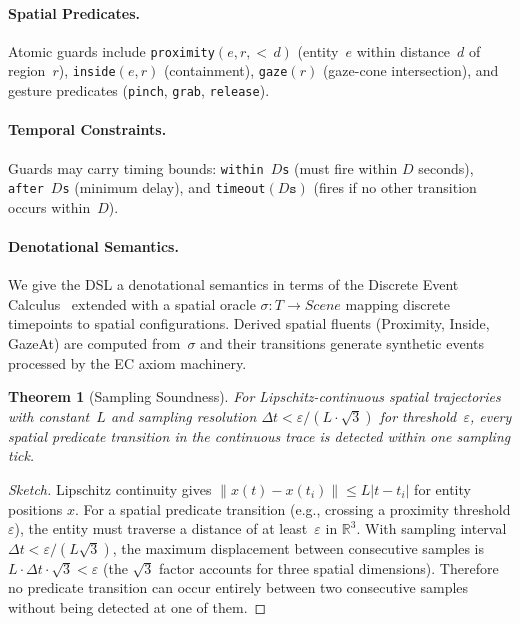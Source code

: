 \documentclass[11pt,a4paper]{article}
\newtheorem{theorem}{Theorem}
\begin{document}
\paragraph{Spatial Predicates.}
Atomic guards include \texttt{proximity}$(e, r, {<}\,d)$ (entity~$e$ within
distance~$d$ of region~$r$), \texttt{inside}$(e, r)$ (containment),
\texttt{gaze}$(r)$ (gaze-cone intersection), and gesture predicates
(\texttt{pinch}, \texttt{grab}, \texttt{release}).

\paragraph{Temporal Constraints.}
Guards may carry timing bounds: \texttt{within}~$D$\texttt{s} (must fire within
$D$ seconds), \texttt{after}~$D$\texttt{s} (minimum delay), and
\texttt{timeout}$(D\texttt{s})$ (fires if no other transition occurs within~$D$).

\paragraph{Denotational Semantics.}
We give the DSL a denotational semantics in terms of the Discrete Event
Calculus~\cite{mueller2006} extended with a spatial oracle
$\sigma : T \to \mathit{Scene}$ mapping discrete timepoints to spatial configurations.
Derived spatial fluents (Proximity, Inside, GazeAt) are computed from~$\sigma$
and their transitions generate synthetic events processed by the EC axiom machinery.

\begin{theorem}[Sampling Soundness]\label{thm:sampling}
For Lipschitz-continuous spatial trajectories with constant~$L$ and sampling
resolution $\Delta t < \varepsilon / (L \cdot \sqrt{3})$ for threshold~$\varepsilon$,
every spatial predicate transition in the continuous trace is detected within one
sampling tick.
\end{theorem}

\begin{proof}[Sketch]
Lipschitz continuity gives $\|x(t) - x(t_i)\| \leq L |t - t_i|$ for entity
positions $x$.
For a spatial predicate transition (e.g., crossing a proximity threshold
$\varepsilon$), the entity must traverse a distance of at least~$\varepsilon$
in $\mathbb{R}^3$.
With sampling interval $\Delta t < \varepsilon / (L \sqrt{3})$, the maximum
displacement between consecutive samples is
$L \cdot \Delta t \cdot \sqrt{3} < \varepsilon$ (the $\sqrt{3}$ factor accounts
for three spatial dimensions).
Therefore no predicate transition can occur entirely between two consecutive
samples without being detected at one of them.
\end{proof}
\end{document}
